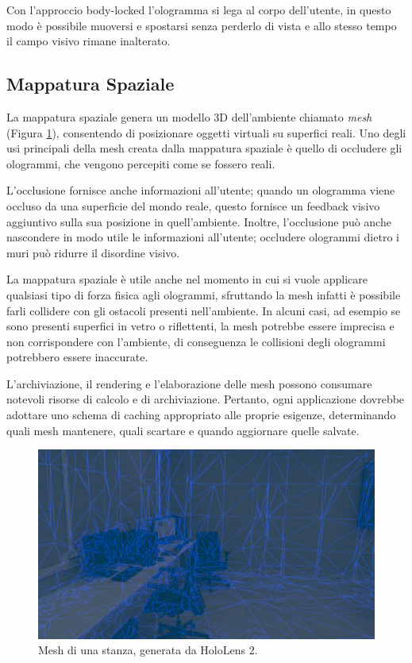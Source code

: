 Con l’approccio body-locked l’ologramma si lega al corpo dell’utente, in questo modo è possibile muoversi e spostarsi senza perderlo di vista e allo stesso tempo il campo visivo rimane inalterato.

\subsection{Mappatura Spaziale}
La mappatura spaziale genera un modello 3D dell’ambiente chiamato \textit{mesh} (Figura \ref{fig:figure22}), consentendo di posizionare oggetti virtuali su superfici reali.
Uno degli usi principali della mesh creata dalla mappatura spaziale è quello di occludere gli ologrammi, che vengono percepiti come se fossero reali. 

L'occlusione fornisce anche informazioni all'utente;
quando un ologramma viene occluso da una superficie del mondo reale, questo fornisce un feedback visivo aggiuntivo sulla sua posizione in quell’ambiente.
Inoltre, l'occlusione può anche nascondere in modo utile le informazioni all'utente; occludere ologrammi dietro i muri può ridurre il disordine visivo. 

La mappatura spaziale è utile anche nel momento in cui si vuole applicare qualsiasi tipo di forza fisica agli ologrammi, sfruttando la mesh infatti è possibile farli collidere con gli ostacoli presenti nell’ambiente.
In alcuni casi, ad esempio se sono presenti superfici in vetro o riflettenti, la mesh potrebbe essere imprecisa e non corrispondere con l’ambiente, di conseguenza le collisioni degli ologrammi potrebbero essere inaccurate. 

L'archiviazione, il rendering e l'elaborazione delle mesh possono consumare notevoli risorse di calcolo e di archiviazione.
Pertanto, ogni applicazione dovrebbe adottare uno schema di caching appropriato alle proprie esigenze, determinando quali mesh mantenere, quali scartare e quando aggiornare quelle salvate.

\begin{figure}[t]
    \centering
    \includegraphics[width=\textwidth]{images/spatial-mapping.jpg}
    \caption{Mesh di una stanza, generata da HoloLens 2.}
    \label{fig:figure22}
\end{figure}

